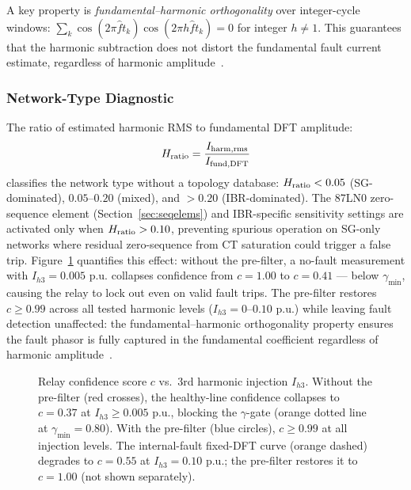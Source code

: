 \documentclass[journal,twoside,10pt]{IEEEtran}
\newcommand{\pu}{\,\text{p.u.}}
\begin{document}
A key property is \emph{fundamental--harmonic orthogonality} over integer-cycle
windows: $\sum_k \cos(2\pi \hat{f} t_k)\cos(2\pi h\hat{f} t_k) = 0$ for
integer $h \neq 1$.  This guarantees that the harmonic subtraction does not
distort the fundamental fault current estimate, regardless of harmonic
amplitude~\cite{SAMBP_TR21}.

\subsubsection{Network-Type Diagnostic}
\label{sec:hratio}

The ratio of estimated harmonic RMS to fundamental DFT amplitude:
\begin{equation}
  H_{\rm ratio} = \frac{I_{\rm harm,rms}}{I_{\rm fund,DFT}}
  \label{eq:hratio}
\end{equation}
classifies the network type without a topology database:
$H_{\rm ratio} < 0.05$ (SG-dominated),
$0.05$--$0.20$ (mixed), and $> 0.20$ (IBR-dominated).
The 87LN0 zero-sequence element (Section~\ref{sec:seqelems}) and
IBR-specific sensitivity settings are activated only when
$H_{\rm ratio} > 0.10$, preventing spurious operation on SG-only networks
where residual zero-sequence from CT saturation could trigger a false trip.
Figure~\ref{fig:confidence} quantifies this effect: without the pre-filter,
a no-fault measurement with $I_{h3} = 0.005\,\pu$ collapses confidence from
$c = 1.00$ to $c = 0.41$ --- below $\gamma_{\min}$, causing the relay to
lock out even on valid fault trips.
The pre-filter restores $c \geq 0.99$ across all tested harmonic levels
($I_{h3} = 0$--$0.10\,\pu$) while leaving fault detection unaffected:
the fundamental--harmonic orthogonality property ensures the fault phasor
is fully captured in the fundamental coefficient regardless of harmonic
amplitude~\cite{SAMBP_TR21}.

\begin{figure}[!t]
  \centering
  
  \caption{Relay confidence score $c$ vs.\ 3rd harmonic injection $I_{h3}$.
           Without the pre-filter (red crosses), the healthy-line confidence
           collapses to $c = 0.37$ at $I_{h3} \geq 0.005\,\pu$, blocking
           the $\gamma$-gate (orange dotted line at $\gamma_{\min} = 0.80$).
           With the pre-filter (blue circles), $c \geq 0.99$ at all injection
           levels.  The internal-fault fixed-DFT curve (orange dashed) degrades
           to $c = 0.55$ at $I_{h3} = 0.10\,\pu$; the pre-filter restores it
           to $c = 1.00$ (not shown separately).}
  \label{fig:confidence}
\end{figure}
\end{document}
